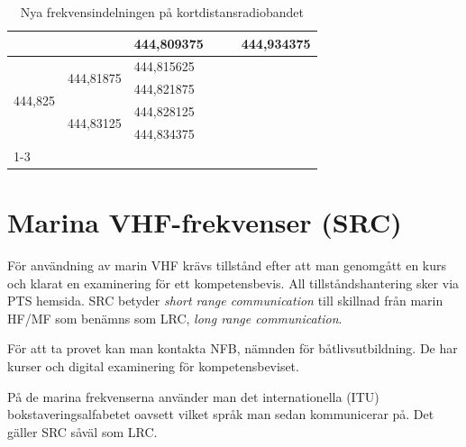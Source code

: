 \begin{table}[H]
\begin{tabular}{|l|l|l|l|l|l|}
		                                               &                                                 & 444,809375                      & \multicolumn{1}{l|}{}                         & \multicolumn{1}{l|}{}                           & \multicolumn{1}{l|}{444,934375} \\ \hline
		\multirow{4}{*}{444,825}                       & \multirow{2}{*}{444,81875}                      & 444,815625                      & \multicolumn{3}{l}{\multirow{4}{*}{}}                                                                                             \\ \cline{3-3}
		                                               &                                                 & 444,821875                      & \multicolumn{3}{l}{}                                                                                                              \\ \cline{2-3}
		                                               & \multirow{2}{*}{444,83125}                      & 444,828125                      & \multicolumn{3}{l}{}                                                                                                              \\ \cline{3-3}
		                                               &                                                 & 444,834375                      & \multicolumn{3}{l}{}                                                                                                              \\ \cline{1-3}
	\end{tabular}
\caption{Nya frekvensindelningen på kortdistansradiobandet}
\label{tab:SRBR-frekvenser}
\end{table}

\section{Marina VHF-frekvenser (SRC)}

För användning av marin VHF krävs tillstånd efter att man genomgått en kurs och
klarat en examinering för ett kompetensbevis. All tillståndshantering sker via
PTS hemsida. SRC betyder \textit{short range communication} till skillnad från
marin HF/MF som benämns som LRC, \textit{long range communication}.

För att ta provet kan man kontakta NFB, nämnden för båtlivsutbildning. De har
kurser och digital examinering för kompetensbeviset.

På de marina frekvenserna använder man det internationella (ITU)
bokstaveringsalfabetet oavsett vilket språk man sedan kommunicerar på. Det
gäller SRC såväl som LRC.

